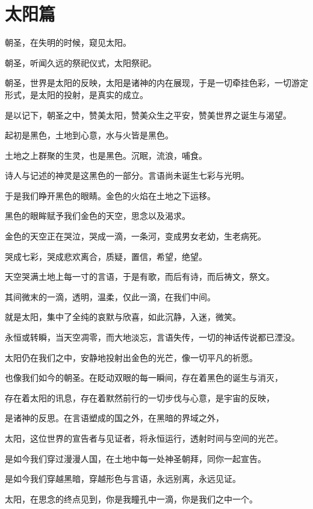 \documentclass[UTF8]{article}
\begin{document}
\section{太阳篇}
\par 朝圣，在失明的时候，窥见太阳。
\par 朝圣，听闻久远的祭祀仪式，太阳祭祀。
\par 朝圣，世界是太阳的反映，太阳是诸神的内在展现，于是一切牵挂色彩，一切游定形式，是太阳的投射，是真实的成立。
\par 是以记下，朝圣之中，赞美太阳，赞美众生之平安，赞美世界之诞生与渴望。
\\[0.6cm]
\par 起初是黑色，土地到心意，水与火皆是黑色。
\par 土地之上群聚的生灵，也是黑色。沉眠，流浪，哺食。
\par 诗人与记述的神灵是这黑色的一部分。言语尚未诞生七彩与光明。
\par 于是我们睁开黑色的眼睛。金色的火焰在土地之下运移。
\par 黑色的眼眸赋予我们金色的天空，思念以及渴求。
\par 金色的天空正在哭泣，哭成一滴，一条河，变成男女老幼，生老病死。
\par 哭成七彩，哭成悲欢离合，质疑，置信，希望，绝望。
\par 天空哭满土地上每一寸的言语，于是有歌，而后有诗，而后祷文，祭文。
\par 其间微末的一滴，透明，温柔，仅此一滴，在我们中间。
\par 就是太阳，集中了全纯的哀默与欣喜，如此沉静，入迷，微笑。
\par 永恒或转瞬，当天空凋零，而大地淡忘，言语失传，一切的神话传说都已湮没。
\par 太阳仍在我们之中，安静地投射出金色的光芒，像一切平凡的祈愿。
\par 也像我们如今的朝圣。在眨动双眼的每一瞬间，存在着黑色的诞生与消灭，
\par 存在着太阳的讯息，存在着默然前行的一切步伐与心意，是宇宙的反映，
\par 是诸神的反思。在言语塑成的国之外，在黑暗的界域之外，
\par 太阳，这位世界的宣告者与见证者，将永恒运行，透射时间与空间的光芒。
\par 是如今我们穿过漫漫人国，在土地中每一处神圣朝拜，同你一起宣告。
\par 是如今我们穿越黑暗，穿越形色与言语，永远别离，永远见证。
\par 太阳，在思念的终点见到，你是我瞳孔中一滴，你是我们之中一个。
\end{document}
